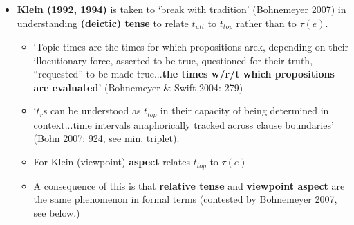 \documentclass[10pt]{article}
\begin{document}
\begin{itemize}
\item \textbf{Klein (1992, 1994)} is taken to `break with tradition' (Bohnemeyer 2007) in understanding \textbf{(deictic) tense} to relate $ t_{utt} $ to $ t_{top} $ rather than to $ \tau(e) $. 
\begin{itemize}
	\item `Topic times are the times for which propositions arek, depending on their illocutionary force, asserted to be true, questioned for their truth, ``requested'' to be made true...\textbf{the times w/r/t which propositions are evaluated}' (Bohnemeyer \& Swift 2004: 279)
	\item `$ t_r $s can be understood as $ t_{top} $ in their capacity of being determined in context...time intervals anaphorically tracked across clause boundaries' (Bohn 2007: 924, see min. triplet).
	\item For Klein (viewpoint) \textbf{aspect} relates $ t_{top} $ to $ \tau(e) $
	\item A consequence of this is that \textbf{relative tense} and \textbf{viewpoint aspect} are the same phenomenon in formal terms (contested by Bohnemeyer 2007, see below.)
\end{itemize}
\end{itemize}
\end{document}
